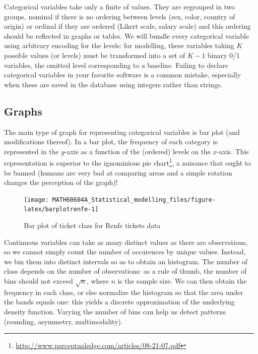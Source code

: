 \documentclass[
  11pt,
  letterpaper,
]{book}
\renewcommand{\href}[2]{#2\footnote{\url{#1}}}
\theoremstyle{definition}
\theoremstyle{definition}
\theoremstyle{definition}
\theoremstyle{remark}
\begin{document}
Categorical variables take only a finite of values. They are regrouped in two groups, nominal if there is no ordering between levels (sex, color, country of origin) or ordinal if they are ordered (Likert scale, salary scale) and this ordering should be reflected in graphs or tables. We will bundle every categorical variable using arbitrary encoding for the levels: for modelling, these variables taking \(K\) possible values (or levels) must be transformed into a set of \(K-1\) binary 0/1 variables, the omitted level corresponding to a baseline. Failing to declare categorical variables in your favorite software is a common mistake, especially when these are saved in the database using integers rather than strings.

\hypertarget{graphs}{%
\subsection{Graphs}\label{graphs}}

The main type of graph for representing categorical variables is bar plot (and modifications thereof). In a bar plot, the frequency of each category is represented in the \(y\)-axis as a function of the (ordered) levels on the \(x\)-axis. This representation is superior to the \href{http://www.perceptualedge.com/articles/08-21-07.pdf}{ignominious pie chart}, a nuisance that ought to be banned (humans are very bad at comparing areas and a simple rotation changes the perception of the graph)!

\begin{figure}

{\centering \texttt{[image: MATH60604A\_Statistical\_modelling\_files/figure-latex/barplotrenfe-1]} 

}

\caption{Bar plot of ticket class for Renfe tickets data}\label{fig:barplotrenfe}
\end{figure}

Continuous variables can take as many distinct values as there are observations, so we cannot simply count the number of occurences by unique values. Instead, we bin them into distinct intervals so as to obtain an histogram. The number of class depends on the number of observations: as a rule of thumb, the number of bins should not exceed \(\sqrt{n}\), where \(n\) is the sample size. We can then obtain the frequency in each class, or else normalize the histogram so that the area under the bands equals one: this yields a discrete approximation of the underlying density function. Varying the number of bins can help us detect patterns (rounding, asymmetry, multimodality).
\end{document}
